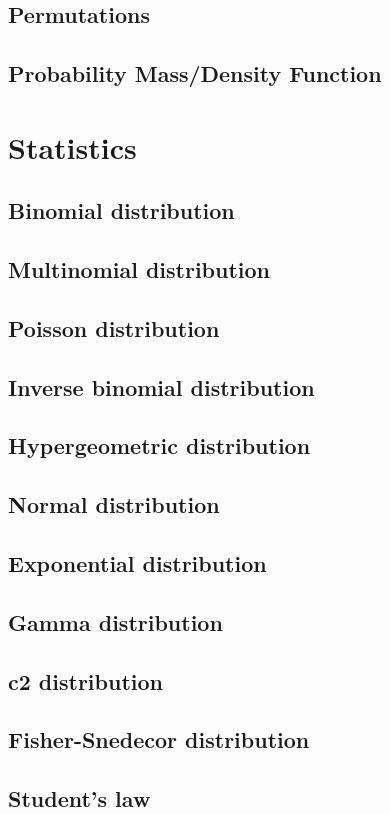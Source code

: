 \documentclass{report}
\begin{document}
	\section{Permutations}
	\section{Probability Mass/Density Function}

\chapter{Statistics}
	\section{Binomial distribution}
	\section{Multinomial distribution}
	\section{Poisson distribution}
	\section{Inverse binomial distribution}
	\section{Hypergeometric distribution}
	\section{Normal distribution}
	\section{Exponential distribution}
	\section{Gamma distribution}
	\section{c2 distribution}
	\section{Fisher-Snedecor distribution}
	\section{Student’s law}
\end{document}
